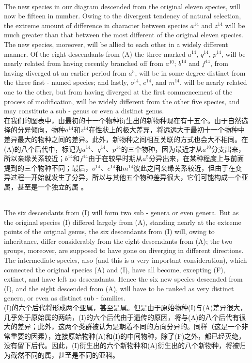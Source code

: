 \documentclass{article}
\begin{document}
\\
The new species in our diagram descended from the original eleven species, will now be fifteen in number. Owing to the divergent tendency of natural selection, the extreme amount of difference in character between species $a^{14}$ and $z^{14}$ will be much greater than that between the most different of the original eleven species. The new species, moreover, will be allied to each other in a widely different manner. Of the eight descendants from (A) the three marked $a^{14}$, $q^{14}$, $p^{14}$, will be nearly related from having recently branched off from $a^{10}$; $b^{14}$ and $f^{14}$, from having diverged at an earlier period from $a^{5}$, will be in some degree distinct from the three first - named species; and lastly, $o^{14}$, $e^{14}$, and $m^{14}$, will be nearly related one to the other, but from having diverged at the first commencement of the process of modification, will be widely different from the other five species, and may constitute a sub - genus or even a distinct genus.\\
在我们的图表中，由最初的十一个物种衍生出的新物种现在有十五个。由于自然选择的分异倾向，物种$a^{14}$和$z^{14}$在性状上的极大差异，将远远大于最初十一个物种中差异最大的物种之间的差异。此外，新物种之间相互关联的方式也会大不相同。在(A)的八个后代中，标记为$a^{14}$、$q^{14}$、$p^{14}$的三个物种，因为最近才从$a^{10}$分支出来，所以亲缘关系较近；$b^{14}$和$f^{14}$由于在较早时期从$a^{5}$分异出来，在某种程度上与前面提到的三个物种不同；最后，$o^{14}$、$e^{14}$和$m^{14}$彼此之间亲缘关系较近，但由于在变异过程一开始就发生了分异，所以与其他五个物种差异很大，它们可能构成一个亚属，甚至是一个独立的属 。 

\\
The six descendants from (I) will form two sub - genera or even genera. But as the original species (I) differed largely from (A), standing nearly at the extreme points of the original genus, the six descendants from (I) will, owing to inheritance, differ considerably from the eight descendants from (A); the two groups, moreover, are supposed to have gone on diverging in different directions. The intermediate species, also (and this is a very important consideration), which connected the original species (A) and (I), have all become, excepting (F), extinct, and have left no descendants. Hence the six new species descended from (I), and the eight descended from (A), will have to be ranked as very distinct genera, or even as distinct sub - families.\\
(I)的六个后代将形成两个亚属，甚至是属。但是由于原始物种(I)与(A)差异很大，几乎处于原始属的两端，(I)的六个后代由于遗传的原因，将与(A)的八个后代有很大的差异；此外，这两个类群被认为是朝着不同的方向分异的。同样（这是一个非常重要的因素），连接原始物种(A)和(I)的中间物种，除了(F)之外，都已经灭绝，没有留下后代。因此，(I)衍生出的六个新物种和(A)衍生出的八个新物种，将被归为截然不同的属，甚至是不同的亚科。 
\end{document}
